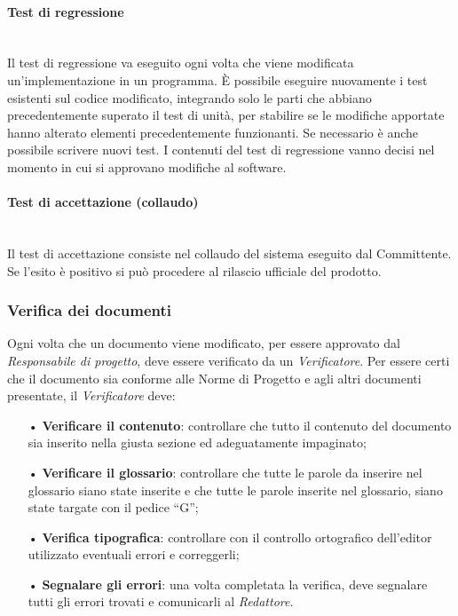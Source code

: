 {\paragraph{Test di regressione}\mbox{}\\
Il test di regressione va eseguito ogni volta che viene modificata un'implementazione in un programma. È possibile eseguire nuovamente i test esistenti sul codice modificato, integrando solo le parti che abbiano precedentemente superato il test di unità, per stabilire se le modifiche apportate hanno alterato elementi precedentemente funzionanti. Se necessario è anche possibile scrivere nuovi test. 
\newline
I contenuti del test di regressione vanno decisi nel momento in cui si approvano modifiche al software.
\paragraph{Test di accettazione (collaudo)}\mbox{}\\
Il test di accettazione consiste nel collaudo del sistema eseguito dal Committente. Se l'esito è positivo si può procedere al rilascio ufficiale del prodotto.

\subsubsection{Verifica dei documenti}
Ogni volta che un documento viene modificato, per essere approvato dal \textit{Responsabile di progetto}, deve essere verificato da un \textit{Verificatore}. 
\newline
Per essere certi che il documento sia conforme alle Norme di Progetto e agli altri documenti presentate, il \textit{Verificatore} deve:
\begin{itemize}
\item[•]\textbf{Verificare il contenuto}: controllare che tutto il contenuto del documento sia inserito nella giusta sezione ed adeguatamente impaginato;
\item[•] \textbf{Verificare il glossario}: controllare che tutte le parole da inserire nel glossario siano state inserite e che tutte le parole inserite nel glossario, siano state targate con il pedice “G”;
\item[•] \textbf{Verifica tipografica}: controllare con il controllo ortografico dell’editor utilizzato eventuali errori e correggerli;
\item[•] \textbf{Segnalare gli errori}: una volta completata la verifica, deve segnalare tutti gli errori trovati e comunicarli al \textit{Redattore}.
\end{itemize}
}
